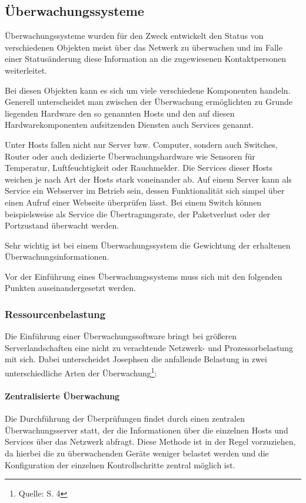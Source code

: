 \subsection{Überwachungssysteme}
\label{monitor}
Überwachungssysteme wurden für den Zweck entwickelt den Status von verschiedenen Objekten meist über das Netwerk zu überwachen und im Falle einer Statusänderung diese Information an die zugewiesenen Kontaktpersonen weiterleitet.

Bei diesen Objekten kann es sich um viele verschiedene Komponenten handeln.
Generell unterscheidet man zwischen der Überwachung ermöglichten zu Grunde liegenden Hardware den so genannten Hosts und den auf diesen Hardwarekomponenten aufsitzenden Diensten auch Services genannt.

Unter Hosts fallen nicht nur Server bzw. Computer, sondern auch Switches, Router oder auch dedizierte Überwachungshardware wie Sensoren für Temperatur, Luftfeuchtigkeit oder Rauchmelder.
Die Services dieser Hosts weichen je nach Art der Hosts stark voneinander ab.
Auf einem Server kann als Service ein Webserver im Betrieb sein, dessen Funktionalität sich simpel über einen Aufruf einer Webseite überprüfen lässt.
Bei einem Switch können beispielsweise als Service die Übertragungsrate, der Paketverlust oder der Portzustand überwacht werden.

Sehr wichtig ist bei einem Überwachungssystem die Gewichtung der erhaltenen Überwachungsinformationen.


\newpage
Vor der Einführung eines Überwachungssystems muss sich mit den folgenden Punkten auseinandergesetzt werden.

\subsubsection{Ressourcenbelastung}
Die Einführung einer Überwachungssoftware bringt bei größeren Serverlandschaften eine nicht zu verachtende Netzwerk- und Prozessorbelastung mit sich.
Dabei unterscheidet Josephsen die anfallende Belastung in zwei unterschiedliche Arten der Überwachung\footnote{Quelle: \cite{Jose07} S. 4}:

\paragraph{Zentralisierte Überwachung}
Die Durchführung der Überprüfungen findet durch einen zentralen Überwachungsserver statt, der die Informationen über die einzelnen Hosts und Services über das Netzwerk abfragt.
Diese Methode ist in der Regel vorzuziehen, da hierbei die zu überwachenden Geräte weniger belastet werden und die Konfiguration der einzelnen Kontrollschritte zentral möglich ist.

